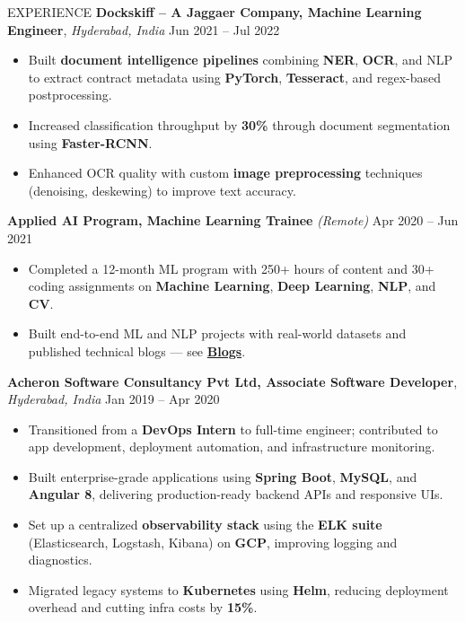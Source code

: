 \documentclass{resume} %
\begin{document}
\begin{rSection}{EXPERIENCE}
\vspace{-0.4em}
\textbf{Dockskiff – A Jaggaer Company, Machine Learning Engineer}, \textit{Hyderabad, India} \hfill Jun 2021 – Jul 2022
\vspace{-0.5em}  %

\begin{itemize}
\itemsep -3pt {}
    \item Built \textbf{document intelligence pipelines} combining \textbf{NER}, \textbf{OCR}, and NLP to extract contract metadata using \textbf{PyTorch}, \textbf{Tesseract}, and regex-based postprocessing.
    \item Increased classification throughput by \textbf{30\%} through document segmentation using \textbf{Faster-RCNN}.
    \item Enhanced OCR quality with custom \textbf{image preprocessing} techniques (denoising, deskewing) to improve text accuracy.
\end{itemize}

\vspace{-0.4em}
\textbf{Applied AI Program, Machine Learning Trainee} \textit{(Remote)} \hfill Apr 2020 – Jun 2021  
\vspace{-0.5em}  %

\begin{itemize}
    \itemsep -3pt {}
    \item Completed a 12-month ML program with 250+ hours of content and 30+ coding assignments on \textbf{Machine Learning}, \textbf{Deep Learning}, \textbf{NLP}, and \textbf{CV}.
    \item Built end-to-end ML and NLP projects with real-world datasets and published technical blogs — see  \href{https://medium.com/@sunil-belde102}{\textbf{Blogs}}.
\end{itemize}



\vspace{-0.4em}
\textbf{Acheron Software Consultancy Pvt Ltd, Associate Software Developer}, \textit{Hyderabad, India} \hfill Jan 2019 – Apr 2020
\vspace{-0.5em}  %

\begin{itemize}
\itemsep -3pt {}
    \item Transitioned from a \textbf{DevOps Intern} to full-time engineer; contributed to app development, deployment automation, and infrastructure monitoring.
    \item Built enterprise-grade applications using \textbf{Spring Boot}, \textbf{MySQL}, and \textbf{Angular 8}, delivering production-ready backend APIs and responsive UIs.
    \item Set up a centralized \textbf{observability stack} using the \textbf{ELK suite} (Elasticsearch, Logstash, Kibana) on \textbf{GCP}, improving logging and diagnostics.
    \item Migrated legacy systems to \textbf{Kubernetes} using \textbf{Helm}, reducing deployment overhead and cutting infra costs by \textbf{15\%}.
\end{itemize}




\end{rSection}
\end{document}
